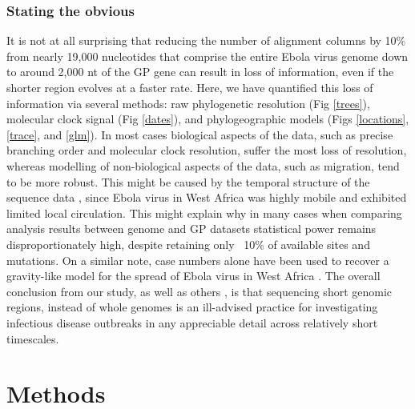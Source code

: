 \documentclass[11pt,oneside,letterpaper]{article}
\begin{document}
\subsubsection*{Stating the obvious}
It is not at all surprising that reducing the number of alignment columns by 10\% from nearly 19,000 nucleotides that comprise the entire Ebola virus genome down to around 2,000 nt of the GP gene can result in loss of information, even if the shorter region evolves at a faster rate.
Here, we have quantified this loss of information via several methods: raw phylogenetic resolution (Fig \ref{trees}), molecular clock signal (Fig \ref{dates}), and phylogeographic models (Figs \ref{locations}, \ref{trace}, and \ref{glm}).
In most cases biological aspects of the data, such as precise branching order and molecular clock resolution, suffer the most loss of resolution, whereas modelling of non-biological aspects of the data, such as migration, tend to be more robust.
This might be caused by the temporal structure of the sequence data \citep{boskova_influence_2018}, since Ebola virus in West Africa was highly mobile and exhibited limited local circulation.
This might explain why in many cases when comparing analysis results between genome and GP datasets statistical power remains disproportionately high, despite retaining only ~10\% of available sites and mutations.
On a similar note, case numbers alone have been used to recover a gravity-like model for the spread of Ebola virus in West Africa \citep{kramer_spatial_2016}.
The overall conclusion from our study, as well as others \citep{wohl_co-circulating_2018}, is that sequencing short genomic regions, instead of whole genomes is an ill-advised practice for investigating infectious disease outbreaks in any appreciable detail across relatively short timescales.

\section*{Methods}
\end{document}
